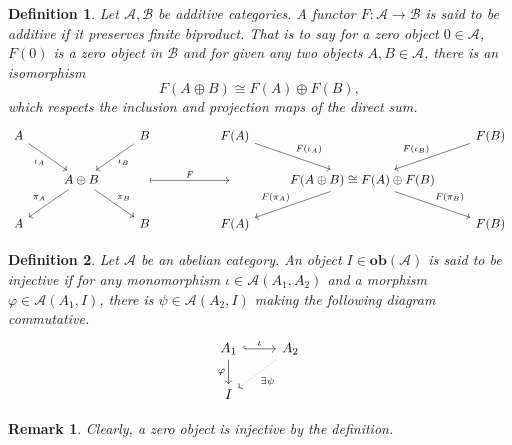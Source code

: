 \documentclass{article}
\newtheorem{definition}{Definition}[section]
\newtheorem{remark}{Remark}[section]
\numberwithin{equation}{section}
\begin{document}
\begin{definition}
Let $\mathscr{A},\mathscr{B}$ be additive categories. A functor $F:\mathscr{A}\to\mathscr{B}$ is said to be additive if it preserves finite biproduct. That is to say for a zero object $0\in\mathscr{A}$, $F(0)$ is a zero object in $\mathscr{B}$ and for given any two objects $A,B\in\mathscr{A}$, there is an isomorphism 
\begin{equation*}
F(A\oplus B)\cong F(A)\oplus F(B),
\end{equation*}
which respects the inclusion and projection maps of the direct sum.
\[
\begin{tikzcd}
A \arrow[rd, "\iota_A"'] &                                                    & B \arrow[ld, "\iota_B"]     &  & F(A) \arrow[rd, "F(\iota_A)"] &                                                                                  & F(B) \arrow[ld, "F(\iota_B)"'] \\
                         & A\oplus B \arrow[ld, "\pi_A"'] \arrow[rd, "\pi_B"] & {} \arrow[rr, "F", maps to] &  & {}                            & F(A\oplus B)\cong F(A)\oplus F(B) \arrow[ld, "F(\pi_A)"'] \arrow[rd, "F(\pi_B)"] &                                \\
A                        &                                                    & B                           &  & F(A)                          &                                                                                  & F(B)                          
\end{tikzcd}
\]
\end{definition}

\begin{definition}
Let $\mathscr{A}$ be an abelian category. An object $I\in\mathbf{ob}(\mathscr{A})$ is said to be injective if for any monomorphism $\iota\in\mathscr{A}(A_1,A_2)$ and a morphism $\varphi\in\mathscr{A}(A_1,I)$, there is $\psi\in\mathscr{A}(A_2,I)$ making the following diagram commutative.
\[
\begin{tikzcd}
A_1 \arrow[r, "\iota", hook] \arrow[d, "\varphi"'] & A_2 \arrow[ld, "\exists\psi", dotted] \\
I                                                  &                                      
\end{tikzcd}
\]
\end{definition}

\begin{remark}
Clearly, a zero object is injective by the definition.
\end{remark}
\end{document}
